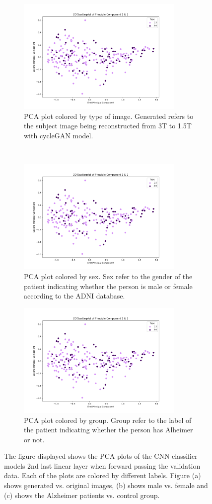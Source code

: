 \documentclass[12pt, fleqn, titlepage]{article}
\newcommand{\1}[1]{\mathds{1}\left[#1\right]}
\begin{document}
\begin{figure}[H]
	\centering
	\begin{subfigure}[t]{0.59\textwidth}
		\centering
		\includegraphics[height=2.2in]{imgs/classifier/not_generated_imgs_pca_type}%
		\caption{PCA plot colored by type of image. Generated refers to the subject image being reconstructed from 3T to 1.5T with cycleGAN model.}
	\end{subfigure}%
	~
	\begin{subfigure}[t]{0.5\textwidth}
		\centering
		\includegraphics[height=2.2in]{imgs/classifier/not_generated_imgs_pca_sex}%
		\caption{PCA plot colored by sex. Sex refer to the gender of the patient indicating whether the person is male or female according to the ADNI database.}	
	\end{subfigure}
	\begin{subfigure}[t]{0.5\textwidth}
		\centering
		\includegraphics[height=2.2in]{imgs/classifier/not_generated_imgs_pca_group}%
		\caption{PCA plot colored by group. Group refer to the label of the patient indicating whether the person has Alheimer or not.}
	\end{subfigure}

	\caption{The figure displayed shows the PCA plots of the CNN classifier models 2nd last linear layer when forward passing the validation data. Each of the plots are colored by different labels. Figure (a) shows generated vs. original images, (b) shows male vs. female and (c) shows the Alzheimer patients vs. control group. }
		\label{fig:pca_not_gen}
\end{figure}
\end{document}
